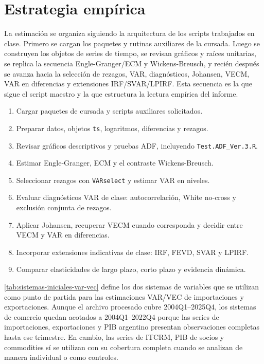 \documentclass[11pt,a4paper]{article}
\begin{document}
	\section{Estrategia empírica}
	\label{sec:estrategia-empirica}

	La estimación se organiza siguiendo la arquitectura de los scripts trabajados
	en clase. Primero se cargan los paquetes y rutinas auxiliares de la cursada.
	Luego se construyen los objetos de series de tiempo, se revisan gráficos y
	raíces unitarias, se replica la secuencia Engle-Granger/ECM y Wickens-Breusch,
	y recién después se avanza hacia la selección de rezagos, VAR, diagnósticos,
	Johansen, VECM, VAR en diferencias y extensiones IRF/SVAR/LPIRF. Esta secuencia
	es la que sigue el script maestro y la que estructura la lectura empírica del
	informe.

	\begin{enumerate}
		\item Cargar paquetes de cursada y scripts auxiliares solicitados.
		\item Preparar datos, objetos \texttt{ts}, logaritmos, diferencias y rezagos.
		\item Revisar gráficos descriptivos y pruebas ADF, incluyendo
		\texttt{Test.ADF\_Ver.3.R}.
		\item Estimar Engle-Granger, ECM y el contraste Wickens-Breusch.
		\item Seleccionar rezagos con \texttt{VARselect} y estimar VAR en niveles.
		\item Evaluar diagnósticos VAR de clase: autocorrelación, White no-cross y
		exclusión conjunta de rezagos.
		\item Aplicar Johansen, recuperar VECM cuando corresponda y decidir entre
		VECM y VAR en diferencias.
		\item Incorporar extensiones indicativas de clase: IRF, FEVD, SVAR y LPIRF.
		\item Comparar elasticidades de largo plazo, corto plazo y evidencia dinámica.
	\end{enumerate}

	\autoref{tab:sistemas-iniciales-var-vec} define los dos sistemas de variables
	que se utilizan como punto de partida para las estimaciones VAR/VEC de
	importaciones y exportaciones. Aunque el archivo procesado cubre 2004Q1--2025Q4,
	los sistemas de comercio quedan acotados a 2004Q1--2022Q4 porque las series de
	importaciones, exportaciones y PIB argentino presentan observaciones completas
	hasta ese trimestre. En cambio, las series de ITCRM, PIB de socios y commodities
	sí se utilizan con su cobertura completa cuando se analizan de manera individual
	o como controles.
\end{document}
